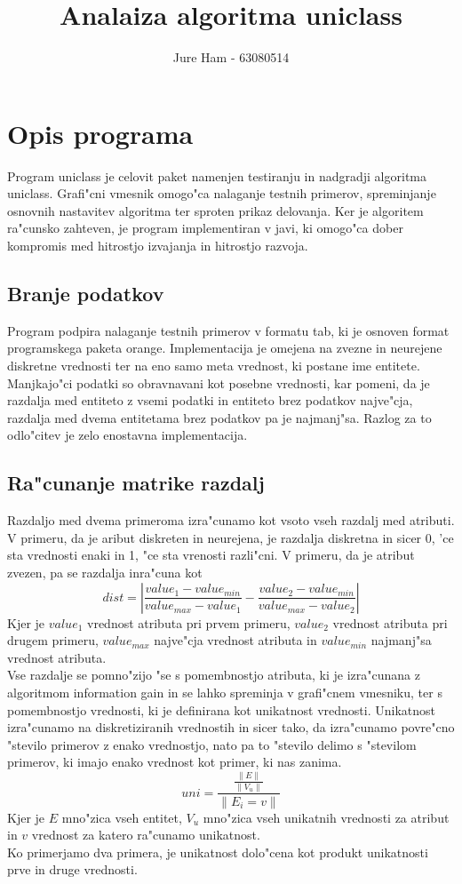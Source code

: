 \documentclass[a4paper]{article}
\title{Analaiza algoritma uniclass}
\author{Jure Ham - 63080514}
\begin{document}
\pagebreak

\section{Opis programa}
	Program uniclass je celovit paket namenjen testiranju in nadgradji algoritma uniclass. Grafi"cni vmesnik omogo"ca nalaganje testnih primerov, spreminjanje osnovnih nastavitev algoritma ter sproten prikaz delovanja. Ker je algoritem ra"cunsko zahteven, je program implementiran v javi, ki omogo"ca dober kompromis med hitrostjo izvajanja in hitrostjo razvoja.

	\subsection{Branje podatkov}
		Program podpira nalaganje testnih primerov v formatu tab, ki je osnoven format programskega paketa orange. Implementacija je omejena na zvezne in neurejene diskretne vrednosti ter na eno samo meta vrednost, ki postane ime entitete. \\
		Manjkajo"ci podatki so obravnavani kot posebne vrednosti, kar pomeni, da je razdalja med entiteto z vsemi podatki in entiteto brez podatkov najve"cja, razdalja med dvema entitetama brez podatkov pa je najmanj"sa. Razlog za to odlo"citev je zelo enostavna implementacija.
	
	\subsection{Ra"cunanje matrike razdalj}
		Razdaljo med dvema primeroma izra"cunamo kot vsoto vseh razdalj med atributi. V primeru, da je aribut diskreten in neurejena, je razdalja diskretna in sicer 0, 'ce sta vrednosti enaki in 1, "ce sta vrenosti razli"cni. V primeru, da je atribut zvezen, pa se razdalja inra"cuna kot $$ dist = \left|\frac{value_1 - value_{min}}{value_{max} - value_1} - \frac{value_2 - value_{min}}{value_{max} - value_2}\right| $$
		Kjer je $value_1$ vrednost atributa pri prvem primeru, $value_2$ vrednost atributa pri drugem primeru, $value_{max}$ najve"cja vrednost atributa in $value_{min}$ najmanj"sa vrednost atributa.\\
		Vse razdalje se pomno"zijo "se s pomembnostjo atributa, ki je izra"cunana z algoritmom information gain in se lahko spreminja v grafi"cnem vmesniku, ter s pomembnostjo vrednosti, ki je definirana kot unikatnost vrednosti. Unikatnost izra"cunamo na diskretiziranih vrednostih in sicer tako, da izra"cunamo povre"cno "stevilo primerov z enako vrednostjo, nato pa to "stevilo delimo s "stevilom primerov, ki imajo enako vrednost kot primer, ki nas zanima. 
		$$ uni = \frac{\frac{\parallel E \parallel}{\parallel V_u \parallel}}{\parallel E_i=v \parallel} $$
		Kjer je $E$ mno"zica vseh entitet, $V_u$ mno"zica vseh unikatnih vrednosti za atribut in $v$ vrednost za katero ra"cunamo unikatnost.\\
		Ko primerjamo dva primera, je unikatnost dolo"cena kot produkt unikatnosti prve in druge vrednosti.
		
\end{document}

